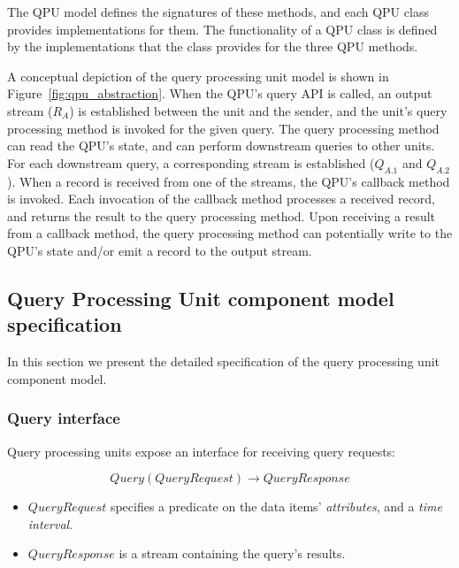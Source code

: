 The QPU model defines the signatures of these methods, and each QPU class provides implementations for them.
The functionality of a QPU class is defined by the implementations that the class provides for the three QPU methods.

\bigskip

A conceptual depiction of the query processing unit model is shown in Figure~\ref{fig:qpu_abstraction}.
When the QPU's query API is called, an output stream ($R_A$) is established between the unit and the sender,
and the unit's query processing method is invoked for the given query.
The query processing method can read the QPU's state, and can perform downstream queries to other units.
For each downstream query, a corresponding stream is established ($Q_{A.1}$ and $Q_{A.2}$).
When a record is received from one of the streams, the QPU's callback method is invoked.
Each invocation of the callback method processes a received record, and returns the result to the query processing
method.
Upon receiving a result from a callback method,
the query processing method can potentially write to the QPU's state and/or emit a record to the output stream.


\subsection{Query Processing Unit component model specification}
\label{ref:specification}

In this section we present the detailed specification of the query processing unit component model.

\subsubsection{Query interface}
\label{ref:query_interface}

Query processing units expose an interface for receiving query requests:

\begin{displaymath}
  Query(QueryRequest) \rightarrow QueryResponse
\end{displaymath}

\begin{itemize}
  \item $QueryRequest$ specifies a predicate on the data items' \textit{attributes}, and a \textit{time interval}.

  \item $QueryResponse$ is a stream containing the query's results.
\end{itemize}


